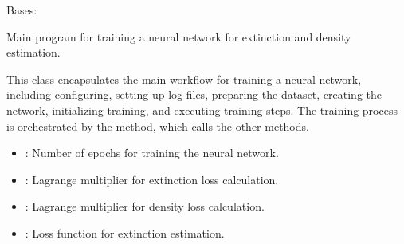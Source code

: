 \documentclass[letterpaper,10pt,english]{sphinxmanual}
\begin{document}
\begin{fulllineitems}
\label{\detokenize{MainTrainer:MainTrainer.MainTrainer}}
\pysigstartsignatures
{}
\pysigstopsignatures
\sphinxAtStartPar
Bases: 

\sphinxAtStartPar
Main program for training a neural network for extinction and density estimation.
\begin{description}
\sphinxAtStartPar
This class encapsulates the main workflow for training a neural network, including configuring,
setting up log files, preparing the dataset, creating the network, initializing training, and executing
training steps. The training process is orchestrated by the  method, which calls the other methods.

\begin{itemize}
\item {} 
\sphinxAtStartPar
{}: Number of epochs for training the neural network.

\item {} 
\sphinxAtStartPar
{}: Lagrange multiplier for extinction loss calculation.

\item {} 
\sphinxAtStartPar
{}: Lagrange multiplier for density loss calculation.

\item {} 
\sphinxAtStartPar
{}: Loss function for extinction estimation.


\end{itemize}
\end{description}
\end{fulllineitems}
\end{document}
